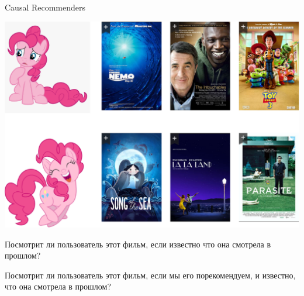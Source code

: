 \documentclass[11pt,aspectratio=169]{beamer}
\begin{document}
\begin{frame}{Causal Recommenders}

\begin{center}
\includegraphics[scale=0.22]{images/serendipity-pony.png}
\end{center}

\end{frame}

\begin{frame}

\begin{tcolorbox}[colback=warn!5,colframe=warn!80,title=Традиционный рекомендер]
Посмотрит ли пользователь этот фильм, если известно что она смотрела в прошлом?
\end{tcolorbox}

\vfill

\begin{tcolorbox}[colback=info!5,colframe=info!80,title=Causal рекомендер]
Посмотрит ли пользователь этот фильм, если мы его порекомендуем, и известно, что она смотрела в прошлом?
\end{tcolorbox}

\end{frame}
\end{document}
